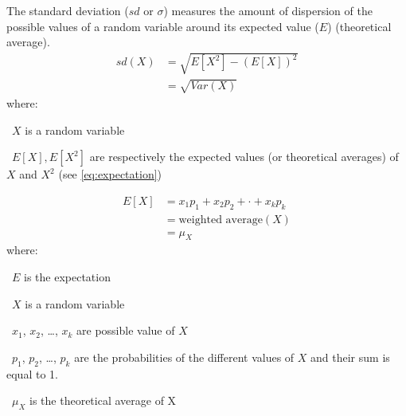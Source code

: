 The standard deviation ($sd$ or $\sigma$) measures the amount of dispersion of the
possible values of a random variable around its expected value ($E$) (theoretical average).
\begin{equation}\label{eq:sd}
    \tag{Standard deviation}
    \begin{split}
        sd(X) & = \sqrt{E[X^2]-{(E[X])}^2} \\
              & = \sqrt{Var(X)}
    \end{split}
\end{equation}
where:
\quad\begin{eqlist}[\setlength{\itemsep}{0em}%
            \setlength{\topsep}{0em}%
            \setlength{\partopsep}{0em}%
            \setlength{\parskip}{0em}%
            \setlength{\parsep}{0em}]
    \item[\textbullet\ $X$] is a random variable
    \item[\textbullet\ ${E[X],E[X^2]}$] are respectively the expected values
        (or theoretical averages) of $X$ and $X^2$ (see \cref{eq:expectation})
\end{eqlist}

\begin{equation}\label{eq:expectation}
    \tag{Expectation}
    \begin{split}
        E[X] & = x_1p_1 + x_2p_2+ \cdot +x_{k}p_{k} \\
        & = \text{weighted average}(X) \\
             & = \mu_X
    \end{split}
\end{equation}
where:%
\quad\begin{eqlist}[\setlength{\itemsep}{0em}%
            \setlength{\topsep}{0em}%
            \setlength{\partopsep}{0em}%
            \setlength{\parskip}{0em}%
            \setlength{\parsep}{0em}]
    \item[\textbullet\ $E$] is the expectation
    \item[\textbullet\ $X$] is a random variable
    \item[\textbullet\ $x_1$, $x_2$, \ldots, $x_k$] are possible value of $X$
    \item[\textbullet\ $p_1$, $p_2$, \ldots, $p_k$] are the probabilities of
        the different values of $X$ and their sum is equal to 1.
    \item[\textbullet\ $\mu_X$] is the theoretical average of X
\end{eqlist}


